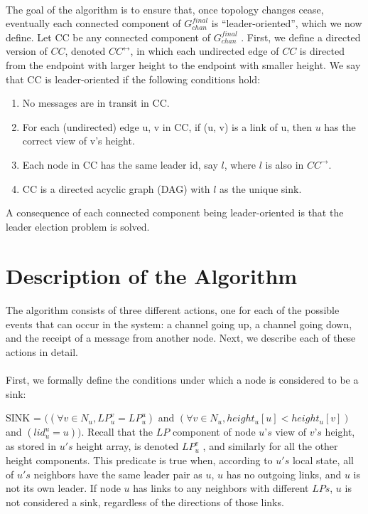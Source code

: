\paragraph{}The goal of the algorithm is to ensure that, once topology changes cease, eventually each connected component of $G_{chan} ^{final}$ is “leader-oriented”, which we now define. Let CC be any connected component of $G_{chan} ^{final}$ . First, we define a directed version of $CC$, denoted $CC^{\longleftrightarrow}$, in which each undirected edge of $CC$ is directed from the endpoint with larger height to the endpoint with smaller height. We say that CC is leader-oriented if the following conditions hold:
\begin{enumerate}
	\item No messages are in transit in CC.
	\item For each (undirected) edge {u, v} in CC, if (u, v) is a link of u, then $u$ has the correct view of v’s height.
	\item  Each node in CC has the same leader id, say $l$, where $l$ is also in $CC^{\longrightarrow}$. 
	\item  CC is a directed acyclic graph (DAG) with $l$ as the unique sink.
\end{enumerate}
A consequence of each connected component being leader-oriented is that the leader election problem is solved.
\section{Description of the Algorithm}
\paragraph{}The algorithm consists of three different actions, one for each of the possible events that can occur in the system: a channel going up, a channel going down, and the receipt of a message from another node. Next, we describe each of these actions in detail.
\paragraph{}First, we formally define the conditions under which a node is considered to be a sink:
\begin{list}{--}{spacing}
	\item SINK = $((\forall v \in N_u, LP_u ^v = LP_u ^u )$ and $(\forall v \in N_u, height_u[u] < height_u[v])$ and $(lid_u ^u = u))$. Recall that the $LP$ component of node $u’s$ view of $v’s$ height, as stored in $u's$ height array, is denoted $LP_u ^v$ , and similarly for all the other height components. This predicate is true when, according to $u's$ local state, all of $u's$ neighbors have the same leader pair as $u$, $u$ has no outgoing links, and $u$ is not its own leader. If node $u$ has links to any neighbors with different $LPs$, $u$ is not considered a sink, regardless of the directions of those links.
\end{list}
